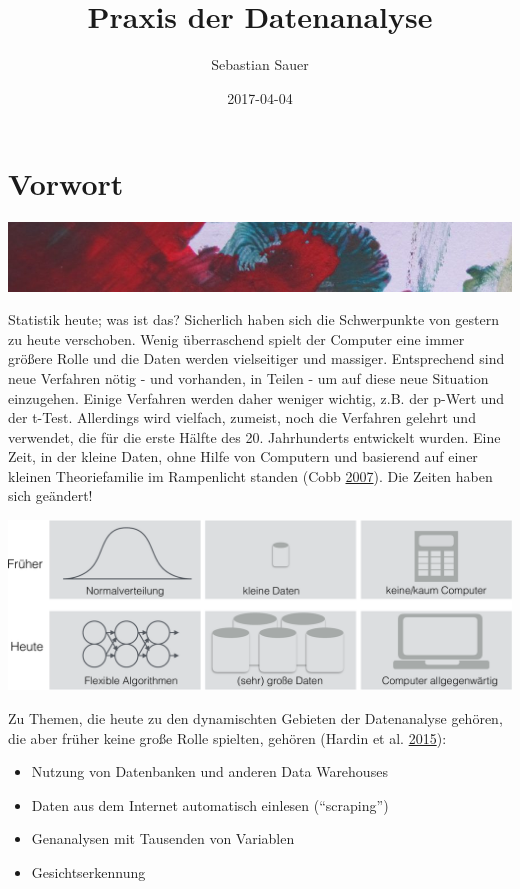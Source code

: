 \documentclass[12pt,]{book}
\title{Praxis der Datenanalyse}
\author{Sebastian Sauer}
\date{2017-04-04}
\providecommand{\tightlist}{%
  \setlength{\itemsep}{0pt}\setlength{\parskip}{0pt}}
\begin{document}
\maketitle

{
\hypersetup{linkcolor=black}
\setcounter{tocdepth}{1}
\tableofcontents
}
\listoftables
\listoffigures
\chapter{Vorwort}\label{vorwort}

\includegraphics[width=1\linewidth]{images/farb1}

Statistik heute; was ist das? Sicherlich haben sich die Schwerpunkte von
gestern zu heute verschoben. Wenig überraschend spielt der Computer eine
immer größere Rolle und die Daten werden vielseitiger und massiger.
Entsprechend sind neue Verfahren nötig - und vorhanden, in Teilen - um
auf diese neue Situation einzugehen. Einige Verfahren werden daher
weniger wichtig, z.B. der p-Wert und der t-Test. Allerdings wird
vielfach, zumeist, noch die Verfahren gelehrt und verwendet, die für die
erste Hälfte des 20. Jahrhunderts entwickelt wurden. Eine Zeit, in der
kleine Daten, ohne Hilfe von Computern und basierend auf einer kleinen
Theoriefamilie im Rampenlicht standen (Cobb
\protect\hyperlink{ref-cobb2007introductory}{2007}). Die Zeiten haben
sich geändert!

\includegraphics{images/Forschung_frueher_heute.pdf}

Zu Themen, die heute zu den dynamischten Gebieten der Datenanalyse
gehören, die aber früher keine große Rolle spielten, gehören (Hardin et
al. \protect\hyperlink{ref-hardin2015data}{2015}):

\begin{itemize}
\tightlist
\item
  Nutzung von Datenbanken und anderen Data Warehouses
\item
  Daten aus dem Internet automatisch einlesen (``scraping'')
\item
  Genanalysen mit Tausenden von Variablen
\item
  Gesichtserkennung
\end{itemize}
\end{document}

